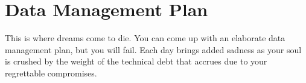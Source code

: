


\section*{Data Management Plan}

This is where dreams come to die. You can come up with an elaborate data management plan, but you will fail. Each day brings added sadness as your soul is crushed by the weight of the technical debt that accrues due to your regrettable compromises.  